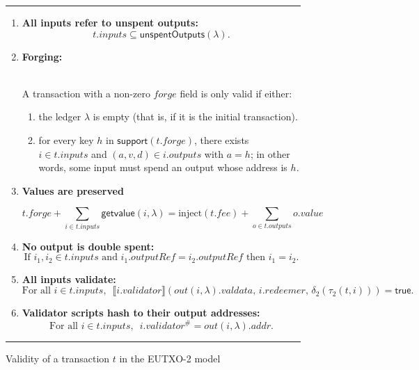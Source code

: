 \documentclass[a4paper]{article}
\newcommand{\msf}[1]{\ensuremath{\mathsf{#1}}}
\newcommand{\mi}[1]{\ensuremath{\mathit{#1}}}
\newcommand\rfskip{7pt}
\newenvironment{ruledfigure}[1]{\begin{figure}[#1]\hrule\vspace{\rfskip}}{\vspace{\rfskip}\hrule\end{figure}}
\newcommand{\true}{\textsf{true}}
\newcommand{\support}{\msf{support}}
\newcommand{\inputs}{\mi{inputs}}
\newcommand{\outputs}{\mi{outputs}}
\newcommand{\forge}{\mi{forge}}
\newcommand{\fee}{\mi{fee}}
\newcommand{\addr}{\mi{addr}}
\newcommand{\val}{\mi{value}}  %
\newcommand{\validator}{\mi{validator}}
\newcommand{\redeemer}{\mi{redeemer}}
\newcommand{\valdata}{\mi{valdata}}
\newcommand{\txout}{\mi{out}}
\newcommand{\getvalue}{\msf{getvalue}}
\newcommand{\unspent}{\msf{unspentOutputs}}
\newcommand{\injectNative}{\ensuremath{\mathrm{inject}}}
\begin{document}
\begin{ruledfigure}{H}
  \begin{enumerate}
    \item \label{rule:all-inputs-refer-to-unspent-outputs-2} \textbf{All
      inputs refer to unspent outputs:}
      \[
        t.\inputs \subseteq \unspent(\lambda).
      \]
    \item \label{rule:forging-2} \textbf{Forging:}\\\\
      \begin{minipage}{0.85\textwidth}
        A transaction with a non-zero \forge{} field is only
        valid if either:
        \begin{enumerate}
          \item the ledger $\lambda$ is empty (that is, if it is the initial transaction).
          \item \label{rule:custom-forge}
            for every key $h$ in $\support(t.\forge)$, there
            exists $i \in t.\inputs$ and $(a,v,d) \in i.\outputs$ with
            $a =h$; in other words, some input must spend an output
            whose address is $h$.
        \end{enumerate}
      \end{minipage}
    \item \textbf{Values are preserved}\\
      \begin{minipage}{0.85\textwidth}
          \label{rule:value-is-preserved-2}
            \[
            t.\forge + \sum_{i \in t.\inputs} \getvalue(i, \lambda) = \injectNative(t.\fee) + \sum_{o \in t.\outputs} o.\val
            \]
      \end{minipage}
    \item \label{rule:no-double-spending-2} \textbf{No output is double spent:}
    \[
     \textrm{If } i_1, i_2 \in t.\inputs \textrm{ and }  i_1.\mathit{outputRef} = i_2.\mathit{outputRef}
     \textrm{ then } i_1 = i_2.
    \]
    \item\label{rule:all-inputs-validate-2} \textbf{All inputs validate:}
    \[
    \textrm{For all } i \in t.\inputs,\enspace \llbracket
    i.\validator\rrbracket(\txout(i,\lambda).\valdata,\, i.\redeemer,\, \delta_2(\tau_2(t, i))) = \true.
      \]
    \item\label{rule:validator-scripts-hash-2} \textbf{Validator scripts hash to their output addresses:}
    \[
      \textrm{For all } i \in t.\inputs,\enspace i.\validator^{\#} = \txout(i, \lambda).\addr.
    \]
  \end{enumerate}
  \caption{Validity of a transaction $t$ in the EUTXO-2 model}
  \label{fig:eutxo-2-validity}

\end{ruledfigure}
\end{document}
